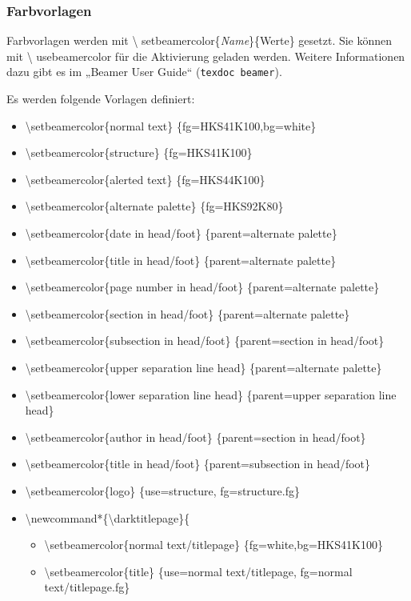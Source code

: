 \documentclass[presentation,t]{beamer}
\begin{document}
\begin{frame}[allowframebreaks]
\frametitle{Farbvorlagen}
\label{sec-2-4-2}

Farbvorlagen werden mit \textbackslash
setbeamercolor\{\emph{Name}\}\{Werte\} gesetzt. Sie können mit \textbackslash
usebeamercolor für die Aktivierung geladen werden. Weitere Informationen dazu gibt es im
„Beamer User Guide“ (\texttt{texdoc beamer}).

Es werden folgende Vorlagen definiert:
\begin{itemize}
\item \textbackslash setbeamercolor\{normal text\} \{fg=HKS41K100,bg=white\}
\item \textbackslash setbeamercolor\{structure\} \{fg=HKS41K100\}
\item \textbackslash setbeamercolor\{alerted text\} \{fg=HKS44K100\}
\item \textbackslash setbeamercolor\{alternate palette\} \{fg=HKS92K80\}
\item \textbackslash setbeamercolor\{date in head/foot\} \{parent=alternate palette\}
\item \textbackslash setbeamercolor\{title in head/foot\} \{parent=alternate palette\}
\item \textbackslash setbeamercolor\{page number in head/foot\} \{parent=alternate palette\}
\item \textbackslash setbeamercolor\{section in head/foot\} \{parent=alternate palette\}
\item \textbackslash setbeamercolor\{subsection in head/foot\} \{parent=section in head/foot\}
\item \textbackslash setbeamercolor\{upper separation line head\} \{parent=alternate palette\}
\item \textbackslash setbeamercolor\{lower separation line head\} \{parent=upper separation line head\}
\item \textbackslash setbeamercolor\{author in head/foot\} \{parent=section in head/foot\}
\item \textbackslash setbeamercolor\{title in head/foot\} \{parent=subsection in head/foot\}
\item \textbackslash setbeamercolor\{logo\} \{use=structure, fg=structure.fg\}
\item \textbackslash newcommand*\{\textbackslash darktitlepage\}\{%
\begin{itemize}
\item \textbackslash setbeamercolor\{normal text/titlepage\} \{fg=white,bg=HKS41K100\}%
\item \textbackslash setbeamercolor\{title\} \{use=normal text/titlepage, fg=normal text/titlepage.fg\}%

\end{itemize}
\end{itemize}
\end{frame}
\end{document}
